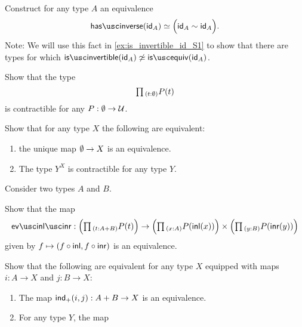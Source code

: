 \begin{exercises}
\item \label{ex:idfunc_autohtpy}Construct for any type $A$ an equivalence
\begin{equation*}
\eqv{\hasinverse(\idfunc[A])}{\Big(\idfunc[A]\htpy\idfunc[A]\Big)}.
\end{equation*}
Note: We will use this fact in \cref{ex:is_invertible_id_S1} to show that there
are types for which $\isinvertible(\idfunc[A])\not\eqvsym\isequiv(\idfunc[A])$.
\item 
\begin{subexenum}
\item Show that the type
\begin{equation*}
\prd{t:\emptyt}P(t)
\end{equation*}
is contractible for any $P:\emptyset\to \mathcal{U}$.
\item Show that for any type $X$ the following are equivalent:
  \begin{enumerate}
  \item the unique map $\emptyset \to X$ is an equivalence.
  \item The type $Y^X$ is contractible for any type $Y$.
  \end{enumerate}
\end{subexenum}
\item Consider two types $A$ and $B$.
\begin{subexenum}
\item Show that the map
\begin{equation*}
  \evinlinr: \Big(\prd{t:A+B}P(t)\Big) \to
  \Big(\prd{x:A}P(\inl(x))\Big)\times\Big(\prd{y:B}P(\inr(y))\Big)
\end{equation*}
given by $f\mapsto (f\circ{\mathsf{inl}},f\circ{\mathsf{inr}})$ is an equivalence.
\item Show that the following are equivalent for any type $X$ equipped with maps $i:A\to X$ and $j:B\to X$:
  \begin{enumerate}
  \item The map $\mathsf{ind}_{+}(i,j) :A+B\to X$ is an equivalence.
  \item For any type $Y$, the map

\end{enumerate}
\end{subexenum}
\end{exercises}
